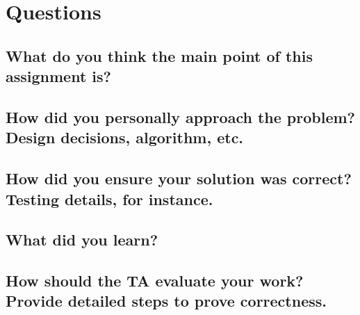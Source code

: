 \documentclass[onecolumn, draftclsnofoot,10pt, compsoc]{IEEEtran}
\begin{document}
\section{Questions}

\subsection{What do you think the main point of this assignment is?}

\subsection{How did you personally approach the problem? Design decisions, algorithm, etc.}

\subsection{How did you ensure your solution was correct? Testing details, for instance.}

\subsection{What did you learn?}

\subsection{How should the TA evaluate your work? Provide detailed steps to prove correctness.}
\begin{itemize}

\end{itemize}
\end{document}
